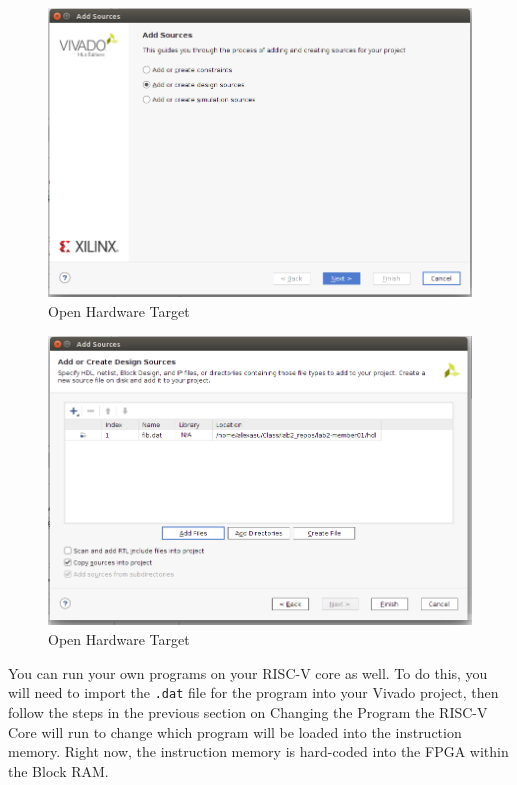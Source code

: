 \documentclass{article}
\begin{document}
\begin{figure}[h!]
  \centering
  \includegraphics[width=0.8\linewidth]{add_sources}
  \caption{Open Hardware Target}
  \label{fig:addsources}
\end{figure}
\begin{figure}[h!]
  \centering
  \includegraphics[width=0.8\linewidth]{copy_sources}
  \caption{Open Hardware Target}
  \label{fig:copysources}
\end{figure}
You can run your own programs on your RISC-V core as well.  To do this, you will
need to import the \verb|.dat| file for the program into your Vivado project,
then follow the steps in the previous section on Changing the Program the RISC-V
Core will run to change which program will be loaded into the instruction
memory.  Right now, the instruction memory is hard-coded into the FPGA
within the Block RAM.
\end{document}
